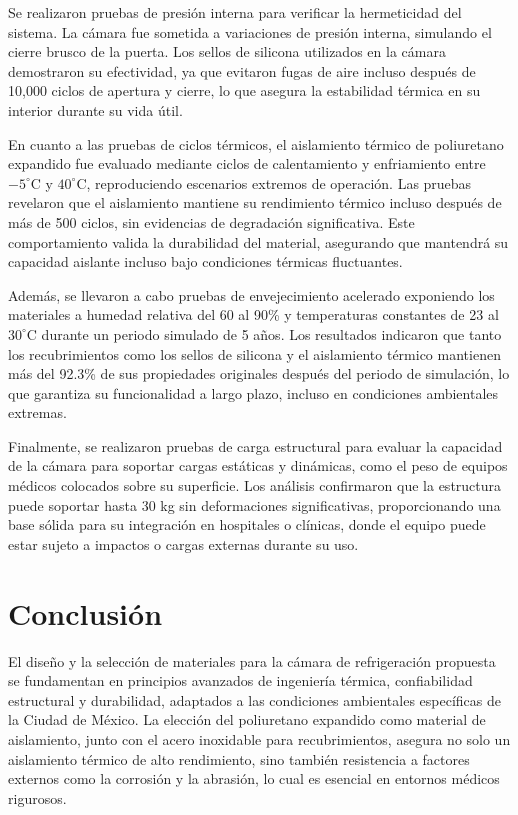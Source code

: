 \documentclass[11pt,a4paper]{article}
\begin{document}
\begin{multicols}{2}
Se realizaron pruebas de presión interna para verificar la hermeticidad del sistema. La cámara fue sometida a variaciones de presión interna, simulando el cierre brusco de la puerta. Los sellos de silicona utilizados en la cámara demostraron su efectividad, ya que evitaron fugas de aire incluso después de 10,000 ciclos de apertura y cierre, lo que asegura la estabilidad térmica en su interior durante su vida útil.

En cuanto a las pruebas de ciclos térmicos, el aislamiento térmico de poliuretano expandido fue evaluado mediante ciclos de calentamiento y enfriamiento entre $-5^\circ$C y $40^\circ$C, reproduciendo escenarios extremos de operación. Las pruebas revelaron que el aislamiento mantiene su rendimiento térmico incluso después de más de 500 ciclos, sin evidencias de degradación significativa. Este comportamiento valida la durabilidad del material, asegurando que mantendrá su capacidad aislante incluso bajo condiciones térmicas fluctuantes.

Además, se llevaron a cabo pruebas de envejecimiento acelerado exponiendo los materiales a humedad relativa del 60 al 90\% y temperaturas constantes de 23 al $30^\circ$C durante un periodo simulado de 5 años. Los resultados indicaron que tanto los recubrimientos como los sellos de silicona y el aislamiento térmico mantienen más del 92.3\% de sus propiedades originales después del periodo de simulación, lo que garantiza su funcionalidad a largo plazo, incluso en condiciones ambientales extremas.

Finalmente, se realizaron pruebas de carga estructural para evaluar la capacidad de la cámara para soportar cargas estáticas y dinámicas, como el peso de equipos médicos colocados sobre su superficie. Los análisis confirmaron que la estructura puede soportar hasta 30 kg sin deformaciones significativas, proporcionando una base sólida para su integración en hospitales o clínicas, donde el equipo puede estar sujeto a impactos o cargas externas durante su uso.
	
	\section{Conclusión}
El diseño y la selección de materiales para la cámara de refrigeración propuesta se fundamentan en principios avanzados de ingeniería térmica, confiabilidad estructural y durabilidad, adaptados a las condiciones ambientales específicas de la Ciudad de México. La elección del poliuretano expandido como material de aislamiento, junto con el acero inoxidable para recubrimientos, asegura no solo un aislamiento térmico de alto rendimiento, sino también resistencia a factores externos como la corrosión y la abrasión, lo cual es esencial en entornos médicos rigurosos.


\end{multicols}
\end{document}
